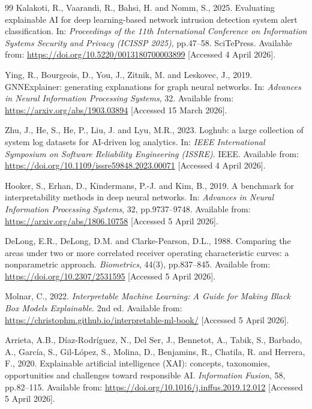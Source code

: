 \documentclass[12pt,a4paper]{report}
\begin{document}
\begin{thebibliography}{99}
Kalakoti, R., Vaarandi, R., Bahsi, H. and Nomm, S., 2025. Evaluating explainable AI for deep learning-based network intrusion detection system alert classification. In: \textit{Proceedings of the 11th International Conference on Information Systems Security and Privacy (ICISSP 2025)}, pp.47--58. SciTePress. Available from: \url{https://doi.org/10.5220/0013180700003899} [Accessed 4 April 2026].

Ying, R., Bourgeois, D., You, J., Zitnik, M. and Leskovec, J., 2019. GNNExplainer: generating explanations for graph neural networks. In: \textit{Advances in Neural Information Processing Systems}, 32. Available from: \url{https://arxiv.org/abs/1903.03894} [Accessed 15 March 2026].

Zhu, J., He, S., He, P., Liu, J. and Lyu, M.R., 2023. Loghub: a large collection of system log datasets for AI-driven log analytics. In: \textit{IEEE International Symposium on Software Reliability Engineering (ISSRE)}. IEEE. Available from: \url{https://doi.org/10.1109/issre59848.2023.00071} [Accessed 4 April 2026].

Hooker, S., Erhan, D., Kindermans, P.-J. and Kim, B., 2019. A benchmark for interpretability methods in deep neural networks. In: \textit{Advances in Neural Information Processing Systems}, 32, pp.9737--9748. Available from: \url{https://arxiv.org/abs/1806.10758} [Accessed 5 April 2026].

DeLong, E.R., DeLong, D.M. and Clarke-Pearson, D.L., 1988. Comparing the areas under two or more correlated receiver operating characteristic curves: a nonparametric approach. \textit{Biometrics}, 44(3), pp.837--845. Available from: \url{https://doi.org/10.2307/2531595} [Accessed 5 April 2026].

Molnar, C., 2022. \textit{Interpretable Machine Learning: A Guide for Making Black Box Models Explainable}. 2nd ed. Available from: \url{https://christophm.github.io/interpretable-ml-book/} [Accessed 5 April 2026].

Arrieta, A.B., D\'{i}az-Rodr\'{i}guez, N., Del Ser, J., Bennetot, A., Tabik, S., Barbado, A., Garc\'{i}a, S., Gil-L\'{o}pez, S., Molina, D., Benjamins, R., Chatila, R. and Herrera, F., 2020. Explainable artificial intelligence (XAI): concepts, taxonomies, opportunities and challenges toward responsible AI. \textit{Information Fusion}, 58, pp.82--115. Available from: \url{https://doi.org/10.1016/j.inffus.2019.12.012} [Accessed 5 April 2026].

\end{thebibliography}
\end{document}
